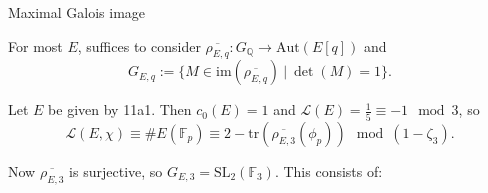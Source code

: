 \documentclass[10pt]{beamer}
\begin{document}
\begin{frame}[t]{Maximal Galois image}

For most $ E $, suffices to consider $ \overline{\rho_{E, q}} : G_\mathbb{Q} \to \mathrm{Aut}(E[q]) $ and
$$ G_{E, q} := \{M \in \mathrm{im}(\overline{\rho_{E, q}}) \ | \ \det(M) = 1\}. $$

\pause

\begin{example}
Let $ E $ be given by 11a1. Then $ c_0(E) = 1 $ and $ \mathcal{L}(E) = \tfrac{1}{5} \equiv -1 \mod 3 $, so
$$ \mathcal{L}(E, \chi) \equiv \#E(\mathbb{F}_p) \equiv 2 - \mathrm{tr}(\overline{\rho_{E, 3}}(\phi_p)) \mod (1 - \zeta_3). $$

\pause

Now $ \overline{\rho_{E, 3}} $ is surjective, so $ G_{E, 3} = \mathrm{SL}_2(\mathbb{F}_3) $. \pause This consists of:


\end{example}
\end{frame}
\end{document}
